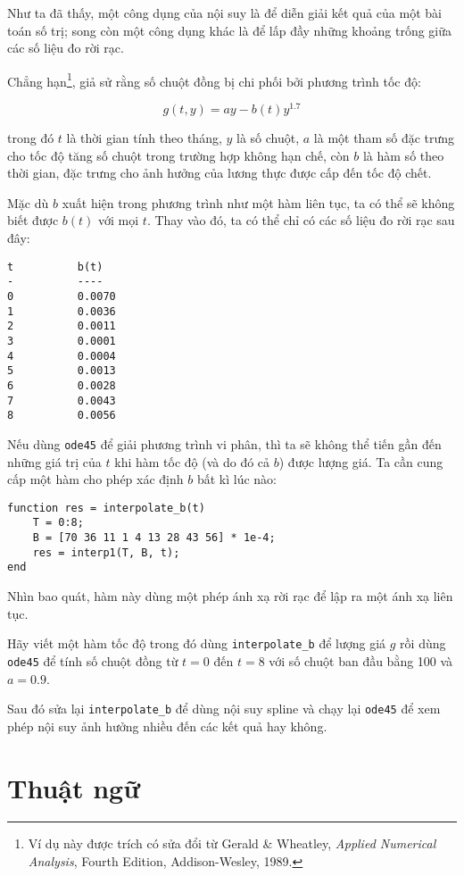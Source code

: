 \documentclass[12pt]{book}
\begin{document}
Như ta đã thấy, một công dụng của nội suy là để diễn giải kết quả của một 
bài toán số trị; song còn một công dụng khác là để lấp đầy những khoảng 
trống giữa các số liệu đo rời rạc.

Chẳng hạn\footnote{Ví dụ này được trích có sửa đổi từ Gerald & Wheatley,
{\em Applied Numerical Analysis}, Fourth Edition, Addison-Wesley,
1989.}, giả sử rằng số chuột đồng bị chi phối bởi phương trình tốc độ:

\[ g(t, y) = ay - b(t) y^{1.7} \]

trong đó  $t$ là thời gian tính theo tháng, $y$ là số chuột, $a$ là một tham số 
đặc trưng cho tốc độ tăng số chuột trong trường hợp không hạn chế, còn 
$b$ là hàm số theo thời gian, đặc trưng cho ảnh hưởng của lương thực 
được cấp đến tốc độ chết.

Mặc dù $b$ xuất hiện trong phương trình như một hàm liên tục, ta có thể sẽ 
không biết được $b(t)$ với mọi $t$.  Thay vào đó, ta có thể chỉ có các số liệu đo 
rời rạc sau đây:

\begin{verbatim}
t          b(t)
-          ----
0          0.0070
1          0.0036             
2          0.0011
3          0.0001
4          0.0004
5          0.0013
6          0.0028
7          0.0043
8          0.0056
\end{verbatim}
%
Nếu dùng {\tt ode45} để giải phương trình vi phân, thì ta sẽ không thể 
tiến gần đến những giá trị của $t$ khi hàm tốc độ (và do đó cả $b$) 
được lượng giá. Ta cần cung cấp một hàm cho phép xác định $b$ bất kì lúc nào:

\begin{verbatim}
function res = interpolate_b(t)
    T = 0:8;
    B = [70 36 11 1 4 13 28 43 56] * 1e-4;
    res = interp1(T, B, t);
end
\end{verbatim}
%
Nhìn bao quát, hàm này dùng một phép ánh xạ rời rạc để lập ra một 
ánh xạ liên tục.

\begin{ex}
Hãy viết một hàm tốc độ trong đó dùng \verb#interpolate_b# để 
lượng giá  $g$ rồi dùng {\tt ode45} để tính số chuột đồng từ 
$t=0$ đến $t=8$ với số chuột ban đầu bằng 100 và $a=0.9$.

Sau đó sửa lại   \verb#interpolate_b# để dùng nội suy spline và 
chạy lại  {\tt ode45} để xem phép nội suy ảnh hưởng nhiều đến các kết 
quả hay không.
\end{ex}

\section{Thuật ngữ}
\end{document}
